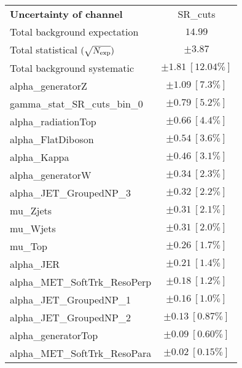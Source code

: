 
\begin{table}
\begin{center}
\setlength{\tabcolsep}{0.0pc}
\begin{tabular*}{\textwidth}{@{\extracolsep{\fill}}lc}
\noalign{\smallskip}\hline\noalign{\smallskip}
{\bf Uncertainty of channel}                                    & SR\_cuts            \\
\noalign{\smallskip}\hline\noalign{\smallskip}
Total background expectation             &  $14.99$       \\
\noalign{\smallskip}\hline\noalign{\smallskip}
Total statistical $(\sqrt{N_{\rm exp}})$              & $\pm 3.87$       \\
Total background systematic               & $\pm 1.81\ [12.04\%] $             \\
\noalign{\smallskip}\hline\noalign{\smallskip}
\noalign{\smallskip}\hline\noalign{\smallskip}
alpha\_generatorZ         & $\pm 1.09\ [7.3\%] $       \\
gamma\_stat\_SR\_cuts\_bin\_0         & $\pm 0.79\ [5.2\%] $       \\
alpha\_radiationTop         & $\pm 0.66\ [4.4\%] $       \\
alpha\_FlatDiboson         & $\pm 0.54\ [3.6\%] $       \\
alpha\_Kappa         & $\pm 0.46\ [3.1\%] $       \\
alpha\_generatorW         & $\pm 0.34\ [2.3\%] $       \\
alpha\_JET\_GroupedNP\_3         & $\pm 0.32\ [2.2\%] $       \\
mu\_Zjets         & $\pm 0.31\ [2.1\%] $       \\
mu\_Wjets         & $\pm 0.31\ [2.0\%] $       \\
mu\_Top         & $\pm 0.26\ [1.7\%] $       \\
alpha\_JER         & $\pm 0.21\ [1.4\%] $       \\
alpha\_MET\_SoftTrk\_ResoPerp         & $\pm 0.18\ [1.2\%] $       \\
alpha\_JET\_GroupedNP\_1         & $\pm 0.16\ [1.0\%] $       \\
alpha\_JET\_GroupedNP\_2         & $\pm 0.13\ [0.87\%] $       \\
alpha\_generatorTop         & $\pm 0.09\ [0.60\%] $       \\
alpha\_MET\_SoftTrk\_ResoPara         & $\pm 0.02\ [0.15\%] $       \\

\end{tabular*}
\end{center}
\end{table}
